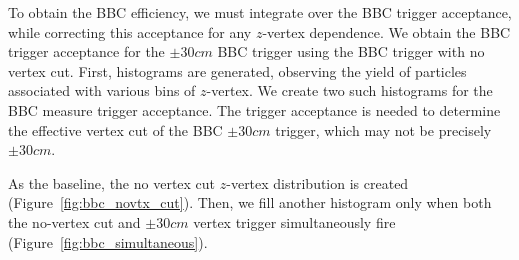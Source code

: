 To obtain the BBC efficiency, we must integrate over the BBC trigger acceptance,
while correcting this acceptance for any $z$-vertex dependence. We obtain the
BBC trigger acceptance for the $\pm30cm$ BBC trigger using the BBC trigger with
no vertex cut. First, histograms are generated, observing the yield of particles
associated with various bins of $z$-vertex. We create two such histograms for
the BBC measure trigger acceptance. The trigger acceptance is needed to
determine the effective vertex cut of the BBC $\pm30cm$ trigger, which may not
be precisely $\pm30cm$.

As the baseline, the no vertex cut $z$-vertex distribution is created
(Figure~\ref{fig:bbc_novtx_cut}). Then, we fill another histogram only when both
the no-vertex cut and $\pm30cm$ vertex trigger simultaneously fire
(Figure~\ref{fig:bbc_simultaneous}). 

